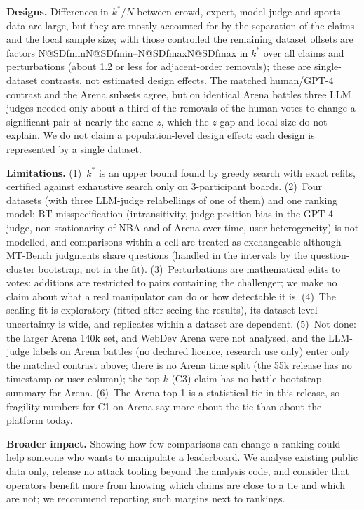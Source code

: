 \documentclass{article}
\makeatletter
\newcommand{\N}[1]{\ifcsname N@#1\endcsname\csname N@#1\endcsname\else\errmessage{unknown number key #1}\fi}
\newcommand{\kst}{k^{\ast}}
\makeatother
\begin{document}
\textbf{Designs.} Differences in $\kst/N$ between crowd, expert, model-judge and sports data are large, but they are mostly accounted for by the separation of the claims and the local sample size; with those controlled the remaining dataset offsets are factors \N{SDfmin}--\N{SDfmax} in $\kst$ over all claims and perturbations (about 1.2 or less for adjacent-order removals); these are single-dataset contrasts, not estimated design effects. The matched human/GPT-4 contrast and the Arena subsets agree, but on identical Arena battles three LLM judges needed only about a third of the removals of the human votes to change a significant pair at nearly the same $z$, which the $z$-gap and local size do not explain. We do not claim a population-level design effect: each design is represented by a single dataset.

\textbf{Limitations.} (1)~$\kst$ is an upper bound found by greedy search with exact refits, certified against exhaustive search only on 3-participant boards. (2)~Four datasets (with three LLM-judge relabellings of one of them) and one ranking model: BT misspecification (intransitivity, judge position bias in the GPT-4 judge, non-stationarity of NBA and of Arena over time, user heterogeneity) is not modelled, and comparisons within a cell are treated as exchangeable although MT-Bench judgments share questions (handled in the intervals by the question-cluster bootstrap, not in the fit). (3)~Perturbations are mathematical edits to votes: additions are restricted to pairs containing the challenger; we make no claim about what a real manipulator can do or how detectable it is. (4)~The scaling fit is exploratory (fitted after seeing the results), its dataset-level uncertainty is wide, and replicates within a dataset are dependent. (5)~Not done: the larger Arena 140k set, and WebDev Arena were not analysed, and the LLM-judge labels on Arena battles (no declared licence, research use only) enter only the matched contrast above; there is no Arena time split (the 55k release has no timestamp or user column); the top-$k$ (C3) claim has no battle-bootstrap summary for Arena. (6)~The Arena top-1 is a statistical tie in this release, so fragility numbers for C1 on Arena say more about the tie than about the platform today.


\textbf{Broader impact.} Showing how few comparisons can change a ranking could help someone who wants to manipulate a leaderboard. We analyse existing public data only, release no attack tooling beyond the analysis code, and consider that operators benefit more from knowing which claims are close to a tie and which are not; we recommend reporting such margins next to rankings.
\end{document}
